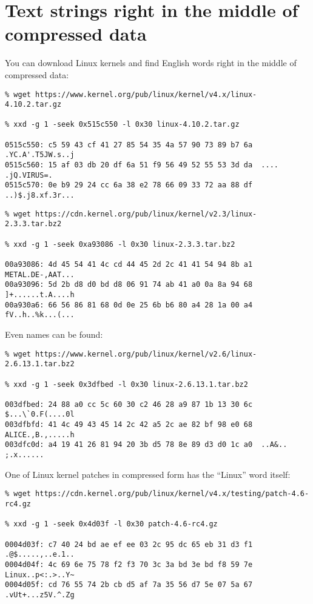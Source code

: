 \section{Text strings right in the middle of compressed data}

You can download Linux kernels and find English words right in the middle of compressed data:

\begin{lstlisting}
% wget https://www.kernel.org/pub/linux/kernel/v4.x/linux-4.10.2.tar.gz

% xxd -g 1 -seek 0x515c550 -l 0x30 linux-4.10.2.tar.gz

0515c550: c5 59 43 cf 41 27 85 54 35 4a 57 90 73 89 b7 6a  .YC.A'.T5JW.s..j
0515c560: 15 af 03 db 20 df 6a 51 f9 56 49 52 55 53 3d da  .... .jQ.VIRUS=.
0515c570: 0e b9 29 24 cc 6a 38 e2 78 66 09 33 72 aa 88 df  ..)$.j8.xf.3r...
\end{lstlisting}

\begin{lstlisting}
% wget https://cdn.kernel.org/pub/linux/kernel/v2.3/linux-2.3.3.tar.bz2

% xxd -g 1 -seek 0xa93086 -l 0x30 linux-2.3.3.tar.bz2

00a93086: 4d 45 54 41 4c cd 44 45 2d 2c 41 41 54 94 8b a1  METAL.DE-,AAT...
00a93096: 5d 2b d8 d0 bd d8 06 91 74 ab 41 a0 0a 8a 94 68  ]+......t.A....h
00a930a6: 66 56 86 81 68 0d 0e 25 6b b6 80 a4 28 1a 00 a4  fV..h..%k...(...
\end{lstlisting}

Even names can be found:

\begin{lstlisting}
% wget https://www.kernel.org/pub/linux/kernel/v2.6/linux-2.6.13.1.tar.bz2

% xxd -g 1 -seek 0x3dfbed -l 0x30 linux-2.6.13.1.tar.bz2

003dfbed: 24 88 a0 cc 5c 60 30 c2 46 28 a9 87 1b 13 30 6c  $...\`0.F(....0l
003dfbfd: 41 4c 49 43 45 14 2c 42 a5 2c ae 82 bf 98 e0 68  ALICE.,B.,.....h
003dfc0d: a4 19 41 26 81 94 20 3b d5 78 8e 89 d3 d0 1c a0  ..A&.. ;.x......
\end{lstlisting}

One of Linux kernel patches in compressed form has the ``Linux'' word itself:

\begin{lstlisting}
% wget https://cdn.kernel.org/pub/linux/kernel/v4.x/testing/patch-4.6-rc4.gz

% xxd -g 1 -seek 0x4d03f -l 0x30 patch-4.6-rc4.gz

0004d03f: c7 40 24 bd ae ef ee 03 2c 95 dc 65 eb 31 d3 f1  .@$.....,..e.1..
0004d04f: 4c 69 6e 75 78 f2 f3 70 3c 3a bd 3e bd f8 59 7e  Linux..p<:.>..Y~
0004d05f: cd 76 55 74 2b cb d5 af 7a 35 56 d7 5e 07 5a 67  .vUt+...z5V.^.Zg
\end{lstlisting}

